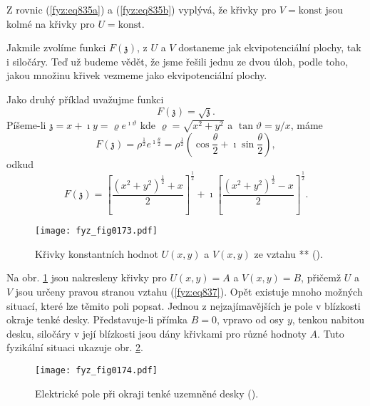   Z rovnic (\ref{fyz:eq835a}) a (\ref{fyz:eq835b}) vyplývá, že křivky pro \(V=\text{konst}\) jsou
  kolmé na křivky pro \(U= \text{konst}\).
  
  Jakmile zvolíme funkci \(F(\mathfrak{z})\), z \(U\) a \(V\) dostaneme jak ekvipotenciální plochy,
  tak i siločáry. Teď už budeme vědět, že jsme řešili jednu ze dvou úloh, podle toho, jakou množinu
  křivek vezmeme jako ekvipotenciální plochy.

  Jako druhý příklad uvažujme funkci
  \begin{equation}\label{fyz:eq836}
    F(\mathfrak{z}) = \sqrt{\mathfrak{z}}.
  \end{equation}
  Píšeme-li \(\mathfrak{z} = x + \imath y = \varrho e^{\imath\vartheta}\) kde \(\varrho = \sqrt{x^2
  + y^2}\) a \(\tan\vartheta = y/x\), máme
  \begin{equation*}
    F(\mathfrak{z}) = ρ^{\frac{1}{2}}e^{\imath\frac{θ}{2}} 
                    = ρ^\frac{1}{2}\left(\cos\dfrac{θ}{2}+\imath\sin\dfrac{θ}{2}\right),
  \end{equation*}
  odkud
  \begin{equation}\label{fyz:eq837}
    F(\mathfrak{z})=\left[\dfrac{(x^2 + y^2)^\frac{1}{2} + x}{2}\right]^\frac{1}{2} 
            + \imath\left[\dfrac{(x^2 + y^2)^\frac{1}{2} − x}{2}\right]^\frac{1}{2}.
  \end{equation}

  \begin{figure}[ht!]  %
    \centering
    \texttt{[image: fyz\_fig0173.pdf]}
    \caption{Křivky konstantních hodnot \(U(x, y)\) a \(V(x, y)\) ze vztahu **
             (\cite[s.~128]{Feynman02}).}
    \label{fyz:fig0173}
  \end{figure}

  Na obr. \ref{fyz:fig0173} jsou nakresleny křivky pro \(U(x,y)=A\) a \(V(x,y) = B\), přičemž \(U\)
  a \(V\) jsou určeny pravou stranou vztahu (\ref{fyz:eq837}). Opět existuje mnoho možných situací,
  které lze těmito poli popsat. Jednou z nejzajímavějších je pole v blízkosti okraje tenké desky.
  Představuje-li přímka \(B = 0\), vpravo od osy \(y\), tenkou nabitou desku, siločáry v její
  blízkosti jsou dány křivkami pro různé hodnoty \(A\). Tuto fyzikální situaci ukazuje obr.
  \ref{fyz:fig0174}.

  \begin{figure}[ht!]  %
    \centering
    \texttt{[image: fyz\_fig0174.pdf]}
    \caption{Elektrické pole při okraji tenké uzemněné desky
             (\cite[s.~128]{Feynman02}).}
    \label{fyz:fig0174}
  \end{figure}

